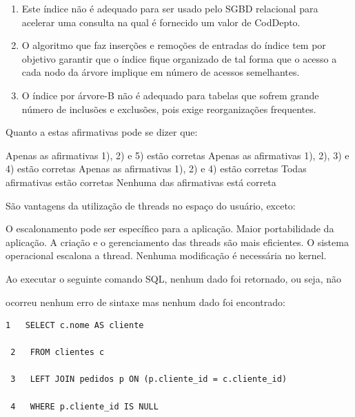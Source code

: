 \documentclass[12pt, addpoints]{exam}
\begin{document}
\begin{questions}
\begin{enumerate}
    \item Este índice não é adequado para ser usado pelo SGBD relacional para acelerar uma consulta na qual é fornecido um valor de CodDepto.

    \item O algoritmo que faz inserções e remoções de entradas do índice tem por objetivo garantir que o índice fique organizado de tal forma que o acesso a cada nodo da árvore implique em número de acessos semelhantes.

    \item O índice por árvore-B não é adequado para tabelas que sofrem grande número de inclusões e exclusões, pois exige reorganizações frequentes.

\end{enumerate}





Quanto a estas afirmativas pode se dizer que:
\begin{choices}
\choice Apenas as afirmativas 1), 2) e 5) estão corretas
\choice Apenas as afirmativas 1), 2), 3) e 4) estão corretas
\choice Apenas as afirmativas 1), 2) e 4) estão corretas
\choice Todas afirmativas estão corretas
\choice Nenhuma das afirmativas está correta
\end{choices}

\question

São vantagens da utilização de threads no espaço do usuário, exceto:
\begin{choices}
\choice O escalonamento pode ser específico para a aplicação.
\choice Maior portabilidade da aplicação.
\choice A criação e o gerenciamento das threads são mais eficientes.
\choice O sistema operacional escalona a thread.
\choice Nenhuma modificação é necessária no kernel.
\end{choices}

\question

Ao executar o seguinte comando SQL, nenhum dado foi retornado, ou seja, não

ocorreu nenhum erro de sintaxe mas nenhum dado foi encontrado:

\begin{tcolorbox}

 \begin{verbatim}1   SELECT c.nome AS cliente

 2   FROM clientes c

 3   LEFT JOIN pedidos p ON (p.cliente_id = c.cliente_id)

 4   WHERE p.cliente_id IS NULL


\end{verbatim}
\end{tcolorbox}
\end{questions}
\end{document}
